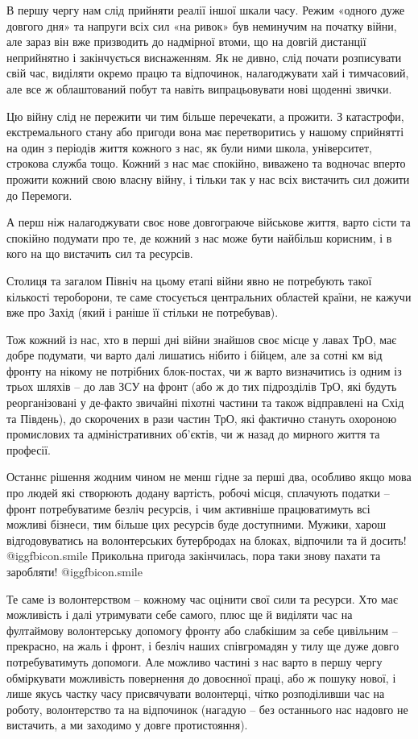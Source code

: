 В першу чергу нам слід прийняти реалії іншої шкали часу. Режим «одного дуже
довгого дня» та напруги всіх сил «на ривок» був неминучим на початку війни, але
зараз він вже призводить до надмірної втоми, що на довгій дистанції неприйнятно
і закінчується виснаженням. Як не дивно, слід почати розписувати свій час,
виділяти окремо працю та відпочинок, налагоджувати хай і тимчасовий, але все ж
облаштований побут та навіть випрацьовувати нові щоденні звички.

Цю війну слід не пережити чи тим більше перечекати, а прожити. З катастрофи,
екстремального стану або пригоди вона має перетворитись у нашому сприйнятті на
один з періодів життя кожного з нас, як були ними школа, університет, строкова
служба тощо. Кожний з нас має спокійно, виважено та водночас вперто прожити
кожний свою власну війну, і тільки так у нас всіх вистачить сил дожити до
Перемоги.

А перш ніж налагоджувати своє нове довгограюче військове життя, варто сісти та
спокійно подумати про те, де кожний з нас може бути найбільш корисним, і в кого
на що вистачить сил та ресурсів.

Столиця та загалом Північ на цьому етапі війни явно не потребують такої
кількості тероборони, те  саме стосується центральних областей країни, не
кажучи вже про Захід (який і раніше її стільки не потребував).

Тож кожний із нас, хто в перші дні війни знайшов своє місце у лавах ТрО, має
добре подумати, чи варто далі лишатись нібито і бійцем, але за сотні км від
фронту на нікому не потрібних блок-постах, чи ж варто визначитись із одним із
трьох шляхів – до лав ЗСУ на фронт (або ж до тих підрозділів ТрО, які будуть
реорганізовані у де-факто звичайні піхотні частини та також відправлені на Схід
та Південь), до скорочених в рази частин ТрО, які фактично стануть охороною
промислових та адміністративних об’єктів, чи ж назад до мирного життя та
професії.

Останнє рішення жодним чином не менш гідне за перші два, особливо якщо мова про
людей які створюють додану вартість, робочі місця, сплачують податки – фронт
потребуватиме безліч ресурсів, і чим активніше працюватимуть всі можливі
бізнеси, тим більше цих ресурсів буде доступними. Мужики, харош відгодовуватись
на волонтерських бутербродах на блоках, відпочили та й досить!  @igg{fbicon.smile}  Прикольна
пригода закінчилась, пора таки знову пахати та заробляти!  @igg{fbicon.smile} 

Те саме із волонтерством – кожному час оцінити свої сили та ресурси. Хто має
можливість і далі утримувати себе самого, плюс ще й виділяти час на фултаймову
волонтерську допомогу фронту або слабкішим за себе цивільним – прекрасно, на
жаль і фронт, і безліч наших співгромадян у тилу ще дуже довго потребуватимуть
допомоги. Але можливо частині з нас варто в першу чергу обміркувати можливість
повернення до довоєнної праці, або ж пошуку нової, і лише якусь частку часу
присвячувати волонтерці, чітко розподіливши час на роботу, волонтерство та на
відпочинок (нагадую – без останнього нас надовго не вистачить, а ми заходимо у
довге протистояння).

